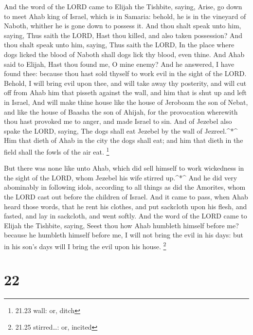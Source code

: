  And the word of the LORD came to Elijah the Tishbite,
saying,  Arise, go down to meet Ahab king of Israel, which
is in Samaria: behold, he is in the vineyard of Naboth, whither he is
gone down to possess it.  And thou shalt speak unto him,
saying, Thus saith the LORD, Hast thou killed, and also taken
possession? And thou shalt speak unto him, saying, Thus saith the LORD,
In the place where dogs licked the blood of Naboth shall dogs lick thy
blood, even thine.  And Ahab said to Elijah, Hast thou
found me, O mine enemy? And he answered, I have found thee: because thou
hast sold thyself to work evil in the sight of the LORD. 
Behold, I will bring evil upon thee, and will take away thy posterity,
and will cut off from Ahab him that pisseth against the wall, and him
that is shut up and left in Israel,  And will make thine
house like the house of Jeroboam the son of Nebat, and like the house of
Baasha the son of Ahijah, for the provocation wherewith thou hast
provoked me to anger, and made Israel to sin.  And of
Jezebel also spake the LORD, saying, The dogs shall eat Jezebel by the
wall of Jezreel.\^{}*\^{}  Him that dieth of Ahab in the
city the dogs shall eat; and him that dieth in the field shall the fowls
of the air eat. \footnote{21.23 wall: or, ditch}

 But there was none like unto Ahab, which did sell himself
to work wickedness in the sight of the LORD, whom Jezebel his wife
stirred up.\^{}*\^{}  And he did very abominably in
following idols, according to all things as did the Amorites, whom the
LORD cast out before the children of Israel.  And it came
to pass, when Ahab heard those words, that he rent his clothes, and put
sackcloth upon his flesh, and fasted, and lay in sackcloth, and went
softly.  And the word of the LORD came to Elijah the
Tishbite, saying,  Seest thou how Ahab humbleth himself
before me? because he humbleth himself before me, I will not bring the
evil in his days: but in his son's days will I bring the evil upon his
house. \footnote{21.25 stirred\ldots: or, incited}

\hypertarget{section-21}{%
\section{22}\label{section-21}}

